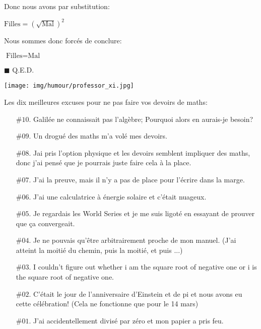 Donc nous avons par substitution:

\begin{center}
$\text{Filles}=\left(\sqrt{\text{Mal}}\right)^2$
\end{center}

Nous sommes donc forcés de conclure:

\begin{center}
$\text{Filles}=\text{Mal}$
\end{center}

	\begin{flushright}
		$\blacksquare$  Q.E.D.
	\end{flushright}
	
	\begin{center}\underline{\hspace{5 cm}}\end{center}
	\begin{center}
		\texttt{[image: img/humour/professor\_xi.jpg]}	
	\end{center}
	
	Les dix meilleures excuses pour ne pas faire vos devoirs de maths:
	
	\begin{itemize}
	
		\item[$\text{\#}10.$] Galilée ne connaissait pas l'algèbre; Pourquoi alors en aurais-je besoin?
	
		\item[$\text{\#}09.$]  Un drogué des maths m'a volé mes devoirs.
	
		\item[$\text{\#}08.$] Jai pris l'option physique et les devoirs semblent impliquer des maths, donc j'ai pensé que je pourrais juste faire cela à la place.
	
		\item[$\text{\#}07.$] J'ai la preuve, mais il n'y a pas de place pour l'écrire dans la marge.
	
		\item[$\text{\#}06.$] J'ai une calculatrice à énergie solaire et c'était nuageux.
	
		\item[$\text{\#}05.$] Je regardais les World Series et je me suis ligoté en essayant de prouver que ça convergeait.
	
		\item[$\text{\#}04.$] Je ne pouvais qu'être arbitrairement proche de mon manuel. (J'ai atteint la moitié du chemin, puis la moitié, et puis ...)
	
		\item[$\text{\#}03.$] I couldn't figure out whether i am the square root of negative one or i is the square root of negative one.
	
		\item[$\text{\#}02.$] C'était le jour de l'anniversaire d'Einstein et de pi et nous avons eu cette célébration! (Cela ne fonctionne que pour le 14 mars)
	
		\item[$\text{\#}01.$] J'ai accidentellement divisé par zéro et mon papier a pris feu.	
	\end{itemize}

